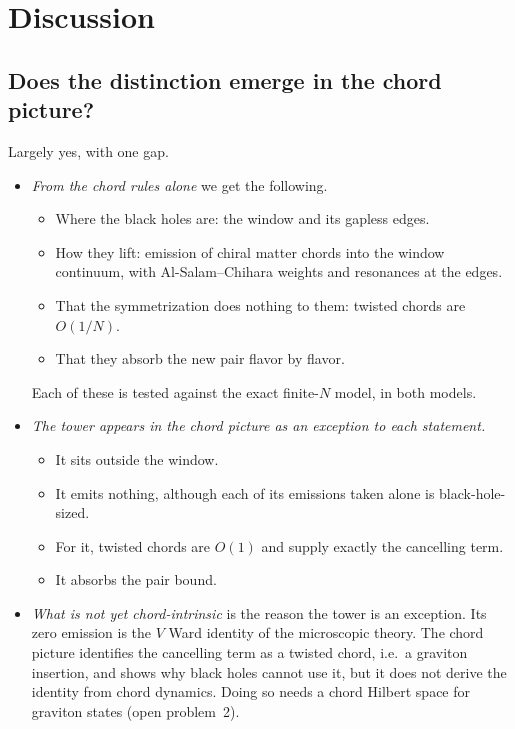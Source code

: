 \documentclass[11pt]{article}
\theoremstyle{plain}
\theoremstyle{remark}
\numberwithin{equation}{section}
\begin{document}
\section{Discussion}\label{sec:discussion}

\subsection{Does the distinction emerge in the chord picture?}

Largely yes, with one gap.
\begin{itemize}\itemsep2pt
\item \emph{From the chord rules alone} we get the following.
  \begin{itemize}\itemsep1pt
  \item Where the black holes are: the window and its gapless edges.
  \item How they lift: emission of chiral matter chords into the window continuum, with Al-Salam--Chihara weights and
    resonances at the edges.
  \item That the symmetrization does nothing to them: twisted chords are $O(1/N)$.
  \item That they absorb the new pair flavor by flavor.
  \end{itemize}
  Each of these is tested against the exact finite-$N$ model, in both models.
\item \emph{The tower appears in the chord picture as an exception to each statement.}
  \begin{itemize}\itemsep1pt
  \item It sits outside the window.
  \item It emits nothing, although each of its emissions taken alone is black-hole-sized.
  \item For it, twisted chords are $O(1)$ and supply exactly the cancelling term.
  \item It absorbs the pair bound.
  \end{itemize}
\item \emph{What is not yet chord-intrinsic} is the reason the tower is an exception. Its zero emission is the $V$ Ward
  identity of the microscopic theory. The chord picture identifies the cancelling term as a twisted chord, i.e.\ a
  graviton insertion, and shows why black holes cannot use it, but it does not derive the identity from chord dynamics.
  Doing so needs a chord Hilbert space for graviton states (open problem~2).
\end{itemize}
\end{document}
